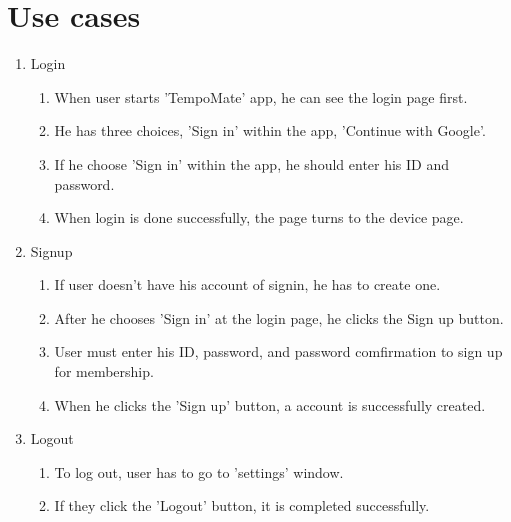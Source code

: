 \newpage
\section{\Large{Use cases}}

\begin{enumerate}[label=\arabic*]
    \item Login
          \begin{enumerate}
              \item When user starts 'TempoMate' app, he can see the login page first. \\
              \item He has three choices, 'Sign in' within the app, 'Continue with Google'. \\
              \item If he choose 'Sign in' within the app, he should enter his ID and password. \\
              \item When login is done successfully, the page turns to the device page. \\
          \end{enumerate}

    \item Signup
          \begin{enumerate}
              \item If user doesn't have his account of signin, he has to create one. \\
              \item After he chooses 'Sign in' at the login page, he clicks the Sign up button. \\
              \item User must enter his ID, password, and password comfirmation to sign up for membership. \\
              \item When he clicks the 'Sign up' button, a account is successfully created. \\
          \end{enumerate}

    \item Logout
          \begin{enumerate}
              \item To log out, user has to go to 'settings' window.\\
              \item If they click the 'Logout' button, it is completed successfully.\\
          \end{enumerate}
\end{enumerate}

